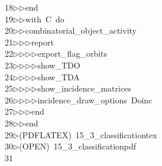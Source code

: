 \begin{tabbing}
18\>$\triangleright$\>$\triangleright$\>end\ \\[0pt]
19\>$\triangleright$\>$\triangleright$\>with\ C\ do\ \\[0pt]
20\>$\triangleright$\>$\triangleright$\>combinatorial\_object\_activity\ \\[0pt]
21\>$\triangleright$\>$\triangleright$\>$\triangleright$\>report\ \\[0pt]
22\>$\triangleright$\>$\triangleright$\>$\triangleright$\>$\triangleright$\>export\_flag\_orbits\ \\[0pt]
23\>$\triangleright$\>$\triangleright$\>$\triangleright$\>$\triangleright$\>show\_TDO\ \\[0pt]
24\>$\triangleright$\>$\triangleright$\>$\triangleright$\>$\triangleright$\>show\_TDA\ \\[0pt]
25\>$\triangleright$\>$\triangleright$\>$\triangleright$\>$\triangleright$\>show\_incidence\_matrices\ \\[0pt]
26\>$\triangleright$\>$\triangleright$\>$\triangleright$\>$\triangleright$\>incidence\_draw\_options\ Doinc\ \\[0pt]
27\>$\triangleright$\>$\triangleright$\>$\triangleright$\>end\ \\[0pt]
28\>$\triangleright$\>$\triangleright$\>end\\[0pt]
29\>$\triangleright$\>(PDFLATEX)\ 15\_3\_classificationtex\\[0pt]
30\>$\triangleright$\>(OPEN)\ 15\_3\_classificationpdf\\[0pt]
31\>\end{tabbing}
